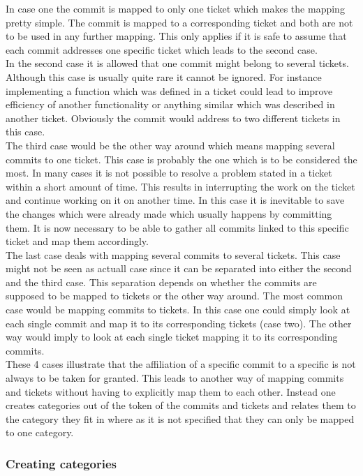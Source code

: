 In case one the commit is mapped to only one ticket which makes the mapping pretty simple. The commit is mapped to a corresponding ticket and both are not to be used in any further mapping. This only applies if it is safe to assume that each commit addresses one specific ticket which leads to the second case.\\
In the second case it is allowed that one commit might belong to several tickets. Although this case is usually quite rare it cannot be ignored. For instance implementing a function which was defined in a ticket could lead to improve efficiency of another functionality or anything similar which was described in another ticket. Obviously the commit would address to two different tickets in this case.\\
The third case would be the other way around which means mapping several commits to one ticket. This case is probably the one which is to be considered the most. In many cases it is not possible to resolve a problem stated in a ticket within a short amount of time. This results in interrupting the work on the ticket and continue working on it on another time. In this case it is inevitable to save the changes which were already made which usually happens by committing them. It is now necessary to be able to gather all commits linked to this specific ticket and map them accordingly.\\
The last case deals with mapping several commits to several tickets. This case might not be seen as actuall case since it can be separated into either the second and the third case. This separation depends on whether the commits are supposed to be mapped to tickets or the other way around. The most common case would be mapping commits to tickets. In this case one could simply look at each single commit and map it to its corresponding tickets (case two). The other way would imply to look at each single ticket mapping it to its corresponding commits.\\
These 4 cases illustrate that the affiliation of a specific commit to a specific is not always to be taken for granted. This leads to another way of mapping commits and tickets without having to explicitly map them to each other. Instead one creates categories out of the token of the commits and tickets and relates them to the category they fit in where as it is not specified that they can only be mapped to one category.

\subsubsection{Creating categories}

